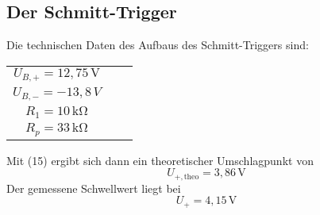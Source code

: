 \subsection{Der Schmitt-Trigger}
Die technischen Daten des Aufbaus des Schmitt-Triggers sind:
\begin{table}[]
\centering
\begin{tabular}{ccc}
$U_{B,+}=12{,}75 \,\si{\V}$ \\
$U_{B,-}=-13{,}8\,\si{V}$ \\
$R_1=10\,\si{\kilo\ohm}$ \\
$R_p=33\,\si{\kilo\ohm}$ \\
\end{tabular}
\end{table}
Mit (15) ergibt sich dann ein theoretischer Umschlagpunkt von
\begin{equation}
U_{+,\text{theo}}=3{,}86\,\si{\V}
\end{equation}
Der gemessene Schwellwert liegt bei
\begin{equation}
U_{+}=4{,}15\,\si{\V}
\end{equation}
